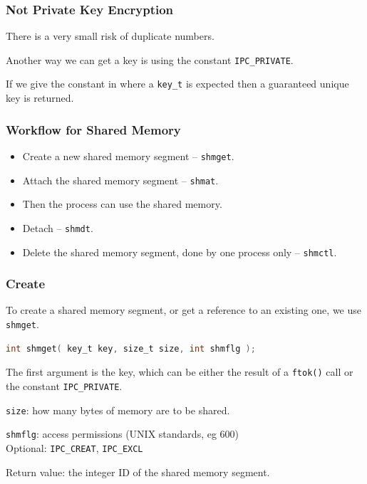 \begin{frame}
	\frametitle{Not Private Key Encryption}

	There is a very small risk of duplicate numbers.

	Another way we can get a key is using the constant \texttt{IPC\_PRIVATE}.

	If we give the constant in where a \texttt{key\_t} is expected then a guaranteed unique key is returned.

\end{frame}


\begin{frame}
	\frametitle{Workflow for Shared Memory}

	\begin{itemize}
		\item Create a new shared memory segment -- \texttt{shmget}.
		\item Attach the shared memory segment -- \texttt{shmat}.
		\item Then the process can use the shared memory.
		\item Detach -- \texttt{shmdt}.
		\item Delete the shared memory segment, done by one process only -- \texttt{shmctl}.
	\end{itemize}

\end{frame}


\begin{frame}[fragile]
	\frametitle{Create}

	To create a shared memory segment, or get a reference to an existing one, we use \texttt{shmget}.

	\begin{lstlisting}[language=C]
int shmget( key_t key, size_t size, int shmflg );
\end{lstlisting}

	The first argument is the key, which can be either the result of a \texttt{ftok()} call or the constant \texttt{IPC\_PRIVATE}.

	\texttt{size}: how many bytes of memory are to be shared.

	\texttt{shmflg}: access permissions (UNIX standards, eg 600)\\
	\quad Optional: \texttt{IPC\_CREAT}, \texttt{IPC\_EXCL}

	Return value: the integer ID of the shared memory segment.
\end{frame}

